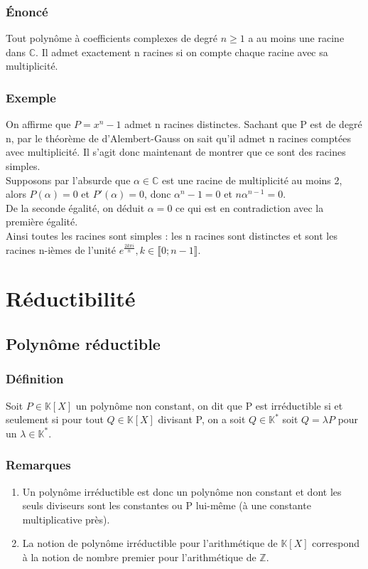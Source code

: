 \documentclass[a4paper,10pt]{book} %
\newcommand{\Z}{\mathbb{Z}}
\newcommand{\C}{\mathbb{C}}
\newcommand{\K}{\mathbb{K}}
\begin{document}
\subsubsection{Énoncé}
Tout polynôme à coefficients complexes de degré $n\geq 1$ a au moins une racine dans $\C$. Il admet exactement n racines si on compte chaque racine avec sa multiplicité.

\subsubsection{Exemple}
On affirme que $P=x^{n}-1$ admet n racines distinctes. Sachant que P est de degré n, par le théorème de d'Alembert-Gauss on sait qu'il admet n racines comptées avec multiplicité. Il s'agit donc maintenant de montrer que ce sont des racines simples.\\

Supposons par l'absurde que $\alpha \in \C$ est une racine de multiplicité au moins 2, alors $P(\alpha)=0$ et $P'(\alpha)=0$, donc $\alpha^{n}-1=0$ et $n\alpha^{n-1}=0$.\\
De la seconde égalité, on déduit $\alpha=0$ ce qui est en contradiction avec la première égalité.\\
Ainsi toutes les racines sont simples : les n racines sont distinctes et sont les racines n-ièmes de l'unité $e^{\frac{2k\pi i}{n}}, k \in \llbracket 0;n-1\rrbracket$.

\section{Réductibilité}
\subsection{Polynôme réductible}
\subsubsection{Définition}
Soit $P\in \K[X]$ un polynôme non constant, on dit que P est irréductible si et seulement si pour tout $Q\in \K[X]$ divisant P, on a soit $Q\in \K^{*}$ soit $Q=\lambda P$ pour un $\lambda\in \K^{*}$.

\subsubsection{Remarques}
\begin{enumerate} \item Un polynôme irréductible est donc un polynôme non constant et dont les seuls diviseurs sont les constantes ou P lui-même (à une constante multiplicative près).
\item La notion de polynôme irréductible pour l'arithmétique de $\K[X]$ correspond à la notion de nombre premier pour l'arithmétique de $\Z$. \end{enumerate}
\end{document}
